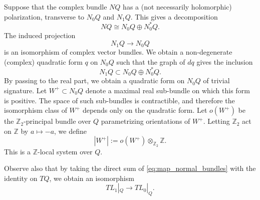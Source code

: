 \documentclass [11pt]{amsart}
\theoremstyle{remark}
\def\zz {{\mathbb{Z}}}
\def\Z {\zz}
\begin{document}
Suppose that the complex bundle $NQ$ has a (not necessarily holomorphic) polarization, transverse to $N_0Q$ and $N_1Q$. This gives a decomposition
\begin{equation} \label{eq:linear_polarization_normal_intersection}
  NQ \cong N_0 Q \oplus N^*_0 Q.
\end{equation}
 The induced projection
\begin{equation} \label{eq:map_normal_bundles}
N_1 Q \to N_0 Q  
\end{equation}
is an isomorphism of complex vector bundles. We obtain a non-degenerate (complex) quadratic form $q$ on $N_0 Q$ such that the graph of $dq$ gives the inclusion
\begin{equation}
  N_1 Q  \subset N_0 Q \oplus N^*_0 Q.   
\end{equation}
By passing to the real part, we obtain a quadratic form on $N_0 Q$ of trivial signature. Let $W^+ \subset N_0 Q$ denote a maximal real sub-bundle on which this form is positive. The space of such sub-bundles is contractible, and therefore the isomorphism class of $W^+$ depends only on the quadratic form. Let $o(W^{+})$ be the $\Z_2$-principal bundle over $Q$ parametrizing orientations of $W^+$. Letting $\Z_2$ act on $\Z$ by $a \mapsto -a$, we define 
$$  |W^{+}| := o(W^+) \otimes_{\Z_2} \Z.$$ 
This is a $\Z$-local system over $Q$.

Observe also that by taking the direct sum of \eqref{eq:map_normal_bundles} with the identity on $TQ$, we obtain an isomorphism
\begin{equation} \label{eq:TLL}
TL_1|_Q \to TL_0|_Q.  
\end{equation}
\end{document}
